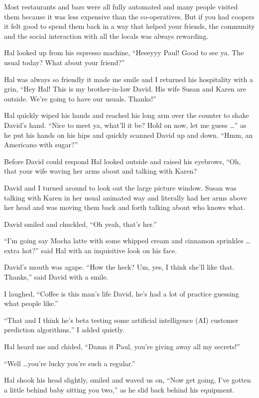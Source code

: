 Most restaurants and bars were all fully automated and many
people visited them because it was less expensive than the
co-operatives. But if you had coopers it felt good to spend them
back in a way that helped your friends, the community and the social
interaction with all the locals was always rewarding.

Hal looked up from his espresso machine, ``Heeeyyy Paul! Good to
see ya. The usual today? What about your friend?''

Hal was always so friendly it made me smile and I returned his
hospitality with a grin, ``Hey Hal! This is my
brother-in-law David. His wife Susan and Karen are outside.
We're going to have our usuals. Thanks!''

Hal quickly wiped his hands and reached his long arm over the
counter to shake David's hand. ``Nice to meet ya, what'll it be?
Hold on now, let me guess \ldots '' as he put his hands
on his hips and quickly scanned David up and down.  ``Hmm, an
Americano with sugar?''

Before David could respond Hal looked outside and raised his
eyebrows, ``Oh, that your wife waving her arms
about and talking with Karen?

David and I turned around to look out the large picture window.
Susan was talking with Karen in her usual animated way and
literally had her arms above her head and was moving them back
and forth talking about who knows what.

David smiled and chuckled, ``Oh yeah, that's her.''

``I'm going say Mocha latte with some whipped cream and cinnamon
sprinkles \ldots extra hot?'' said Hal with an inquisitive
look on his face.

David's mouth was agape. ``How the heck? Um, yes, I think she'll
like that. Thanks,'' said David with a smile.

I laughed, ``Coffee is this man's life David, he's had a lot of
practice guessing what people like.''

``That and I think he's beta testing some artificial
intelligence (AI) customer prediction algorithms,'' I added
quietly.

Hal heard me and chided, ``Damn it Paul, you're giving
away all my secrets!''

``Well \ldots you're lucky you're such a regular.''

Hal shook his head slightly, smiled and waved us on, ``Now get
going, I've gotten a little behind baby sitting you two,'' as he
slid back behind his equipment.

